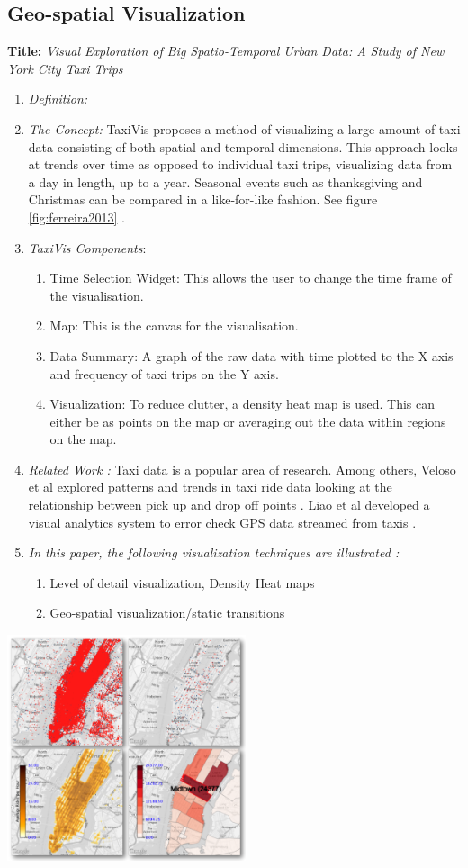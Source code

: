 \documentclass{egpubl}
\begin{document}
\subsection{Geo-spatial Visualization}
\textbf{Title:} \textit{Visual Exploration of Big Spatio-Temporal Urban Data: A Study of New York City Taxi Trips} 
\begin{enumerate}
\item \textit{Definition:} 
\item \textit{The Concept:} TaxiVis proposes a method of visualizing a large amount of taxi data consisting of both spatial and temporal dimensions. This approach looks at trends over time as opposed to individual taxi trips, visualizing data from a day in length, up to a year. Seasonal events such as thanksgiving and Christmas can be compared in a like-for-like fashion. See figure \ref{fig:ferreira2013} \cite{ferreira2013}.
\item \textit{TaxiVis Components}:
\begin{enumerate}
\item Time Selection Widget: This allows the user to change the time frame of the visualisation. 
\item Map: This is the canvas for the visualisation.
\item Data Summary: A graph of the raw data with time plotted to the X axis and frequency of taxi trips on the Y axis.
\item Visualization: To reduce clutter, a density heat map is used. This can either be as points on the map or averaging out the data within regions on the map. 
\end{enumerate}
\item \textit{Related Work :}  Taxi data is a popular area of research. Among others, Veloso et al explored patterns and trends in taxi ride data looking at the relationship between pick up and drop off points \cite{veloso2011,Veloso}. Liao et al developed a visual analytics system to error check GPS data streamed from taxis \cite{liao2010}. 
\item \textit{In this paper, the following visualization techniques are illustrated :} 
\begin{enumerate}
\item Level of detail visualization, Density Heat maps
\item Geo-spatial visualization/static transitions
\end{enumerate}
\end{enumerate}
\begingroup
\centering
\includegraphics[width=7cm]{./images/ferreira2013}
\end{document}
